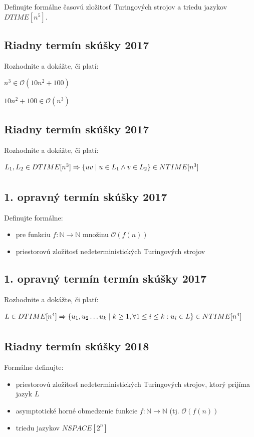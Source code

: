 \documentclass[11pt,a4paper]{article}
\begin{document}
		Definujte formálne časovú zložitosť Turingových strojov a triedu jazykov $DTIME[n^5]$.

		\subsection{Riadny termín skúšky 2017}

		Rozhodnite a dokážte, či platí:

		$n^3 \in \mathcal{O}(10n^2 + 100)$

		$10n^2 + 100 \in \mathcal{O}(n^3)$

		\subsection{Riadny termín skúšky 2017}

		Rozhodnite a dokážte, či platí:

		$L_1, L_2 \in DTIME[n^3] \xRightarrow[]{} \{ uv \mid u \in  L_1 \land v \in L_2\} \in NTIME[n^3]$

		\subsection{1. opravný termín skúšky 2017}

		Definujte formálne:

		\begin{itemize}
			\item pre funkciu $f: \mathbb{N} \rightarrow \mathbb{N}$ množinu $\mathcal{O}(f(n))$
			\item priestorovú zložitosť nedeterministických Turingových strojov
		\end{itemize}

		\subsection{1. opravný termín termín skúšky 2017}

		Rozhodnite a dokážte, či platí:

		$L \in DTIME[n^4] \xRightarrow[]{} \{ u_1, u_2 \ldots u_k \mid k \geq 1, \forall 1 \leq i \leq k: u_i \in L\} \in NTIME[n^4]$

		\subsection{Riadny termín skúšky 2018}

		Formálne definujte:

		\begin{itemize}
			\item priestorovú zložitosť nedeterministických Turingových strojov, ktorý prijíma jazyk $L$
			\item asymptotické horné obmedzenie funkcie $f: \mathbb{N} \rightarrow \mathbb{N}$ (tj. $\mathcal{O}(f(n))$
			\item triedu jazykov $NSPACE[2^n]$
		\end{itemize}
\end{document}
